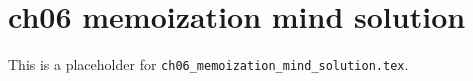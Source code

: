 \chapter{ch06 memoization mind solution}
\label{ch06_memoization_mind_solution}

This is a placeholder for \texttt{ch06_memoization_mind_solution.tex}.


